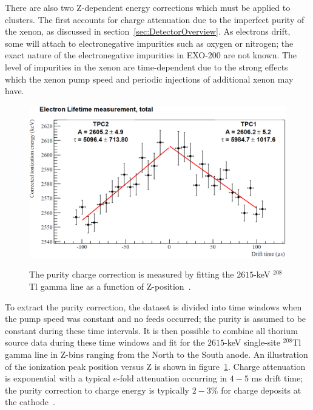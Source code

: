 There are also two Z-dependent energy corrections which must be applied to clusters.  The first accounts for charge attenuation due to the imperfect purity of the xenon, as discussed in section~\ref{sec:DetectorOverview}.  As electrons drift, some will attach to electronegative impurities such as oxygen or nitrogen; the exact nature of the electronegative impurities in EXO-200 are not known.  The level of impurities in the xenon are time-dependent due to the strong effects which the xenon pump speed and periodic injections of additional xenon may have.

\begin{figure}
\begin{center}
\includegraphics[keepaspectratio=true,width=\textwidth]{LongThPurityMeasurement.png}
\end{center}
\renewcommand{\baselinestretch}{1}
\small\normalsize
\begin{quote}
\caption{The purity charge correction is measured by fitting the $2615$-keV $^{208}$Tl gamma line as a function of Z-position~\cite{EnergyDocumentRun2ab}.}
\label{fig:ThPurityMeasurement}
\end{quote}
\end{figure}
\renewcommand{\baselinestretch}{2}
\small\normalsize

To extract the purity correction, the dataset is divided into time windows when the pump speed was constant and no feeds occurred; the purity is assumed to be constant during these time intervals.  It is then possible to combine all thorium source data during these time windows and fit for the $2615$-keV single-site $^{208}$Tl gamma line in Z-bins ranging from the North to the South anode.  An illustration of the ionization peak position versus Z is shown in figure~\ref{fig:ThPurityMeasurement}.  Charge attenuation is exponential with a typical $e$-fold attenuation occurring in $4-5$ ms drift time; the purity correction to charge energy is typically $2-3\%$ for charge deposits at the cathode~\cite{EnergyDocumentRun2ab}.

